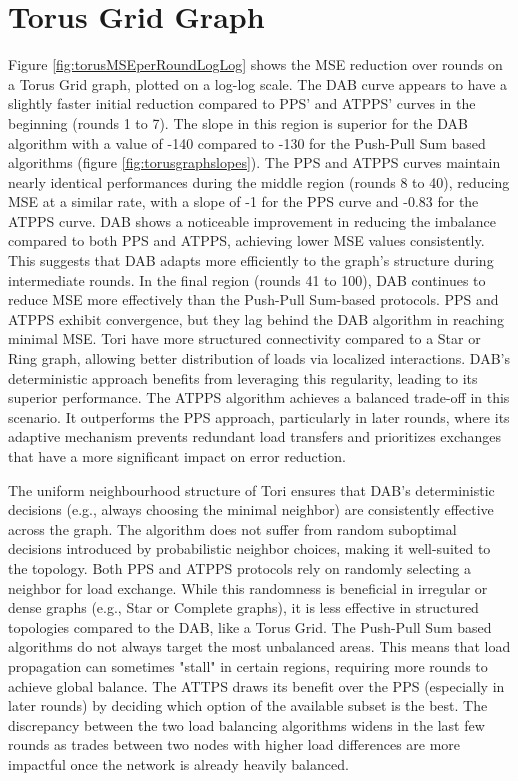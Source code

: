 \section{Torus Grid Graph}\label{sec:torusgridGraph}
Figure \ref{fig:torusMSEperRoundLogLog} shows the MSE reduction over rounds on a Torus Grid graph, plotted on a log-log scale. The DAB curve appears to have a slightly faster initial reduction compared to PPS' and ATPPS' curves in the beginning (rounds 1 to 7). The slope in this region is superior for the DAB algorithm with a value of -140 compared to -130 for the Push-Pull Sum based algorithms (figure \ref{fig:torusgraphslopes}). The PPS and ATPPS curves maintain nearly identical performances during the middle region (rounds 8 to 40), reducing MSE at a similar rate, with a slope of -1 for the PPS curve and -0.83 for the ATPPS curve. DAB shows a noticeable improvement in reducing the imbalance compared to both PPS and ATPPS, achieving lower MSE values consistently. This suggests that DAB adapts more efficiently to the graph's structure during intermediate rounds. In the final region (rounds 41 to 100), DAB continues to reduce MSE more effectively than the Push-Pull Sum-based protocols. PPS and ATPPS exhibit convergence, but they lag behind the DAB algorithm in reaching minimal MSE. Tori have more structured connectivity compared to a Star or Ring graph, allowing better distribution of loads via localized interactions. DAB's deterministic approach benefits from leveraging this regularity, leading to its superior performance. The ATPPS algorithm achieves a balanced trade-off in this scenario. It outperforms the PPS approach, particularly in later rounds, where its adaptive mechanism prevents redundant load transfers and prioritizes exchanges that have a more significant impact on error reduction.

The uniform neighbourhood structure of Tori ensures that DAB's deterministic decisions (e.g., always choosing the minimal neighbor) are consistently effective across the graph. The algorithm does not suffer from random suboptimal decisions introduced by probabilistic neighbor choices, making it well-suited to the topology. Both PPS and ATPPS protocols rely on randomly selecting a neighbor for load exchange. While this randomness is beneficial in irregular or dense graphs (e.g., Star or Complete graphs), it is less effective in structured topologies compared to the DAB, like a Torus Grid. The Push-Pull Sum based algorithms do not always target the most unbalanced areas. This means that load propagation can sometimes "stall" in certain regions, requiring more rounds to achieve global balance. The ATTPS draws its benefit over the PPS (especially in later rounds) by deciding which option of the available subset is the best. The discrepancy between the two load balancing algorithms widens in the last few rounds as trades between two nodes with higher load differences are more impactful once the network is already heavily balanced.

